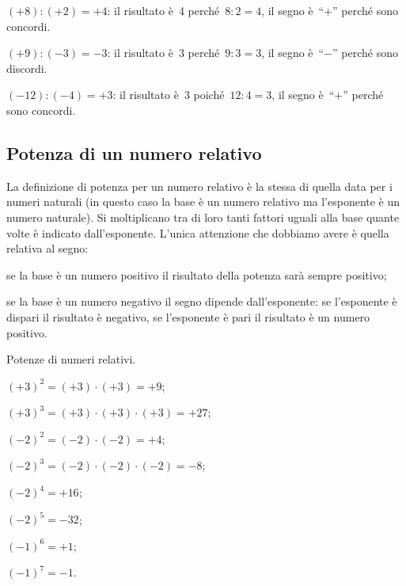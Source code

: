 \begin{exrig}
 \begin{esempio}
$(+8):(+2)=+4$: il risultato è~4 perché~$8:2=4$, il segno è~``$+$'' perché sono concordi.
 \end{esempio}

\begin{esempio}
$(+9):(-3)=-3$: il risultato è~3 perché~$9:3=3$, il segno è~``$-$'' perché sono discordi.
 \end{esempio}

\begin{esempio}
$(-12):(-4)=+3$: il risultato è~3 poiché~$12:4=3$, il segno è~``$+$'' perché sono concordi.
 \end{esempio}

\end{exrig}

\ovalbox{\risolvii \ref{ese:2.19}, \ref{ese:2.20}, \ref{ese:2.21}}

\subsection{Potenza di un numero relativo}

La definizione di potenza per un numero relativo è la stessa di quella data per i numeri naturali
(in questo caso la base è un numero relativo ma l'esponente è un numero naturale).
Si moltiplicano tra di loro tanti fattori uguali alla base quante volte è indicato dall'esponente.
L'unica attenzione che dobbiamo avere è quella relativa al segno:
 \begin{itemize*}
 \item se la base è un numero positivo il risultato della potenza sarà sempre positivo;
 \item se la base è un numero negativo il segno dipende dall'esponente: se l'esponente è dispari il
risultato è negativo, se l'esponente è pari il risultato è un numero positivo.
 \end{itemize*}

\begin{exrig}
 \begin{esempio}
 Potenze di numeri relativi.
  \begin{multicols}{2}
 \begin{itemize*}
 \item $(+3)^2=(+3)\cdot(+3)=+9$;
 \item $(+3)^3=(+3)\cdot(+3)\cdot(+3)=+27$;
 \item $(-2)^2=(-2)\cdot(-2)=+4$;
 \item $(-2)^3=(-2)\cdot(-2)\cdot(-2)=-8$;
 \item $(-2)^4=+16$;
 \item $(-2)^5=-32$;
 \item $(-1)^6=+1$;
 \item $(-1)^7=-1$.
 \end{itemize*}
  \end{multicols}
 \end{esempio}
\end{exrig}

